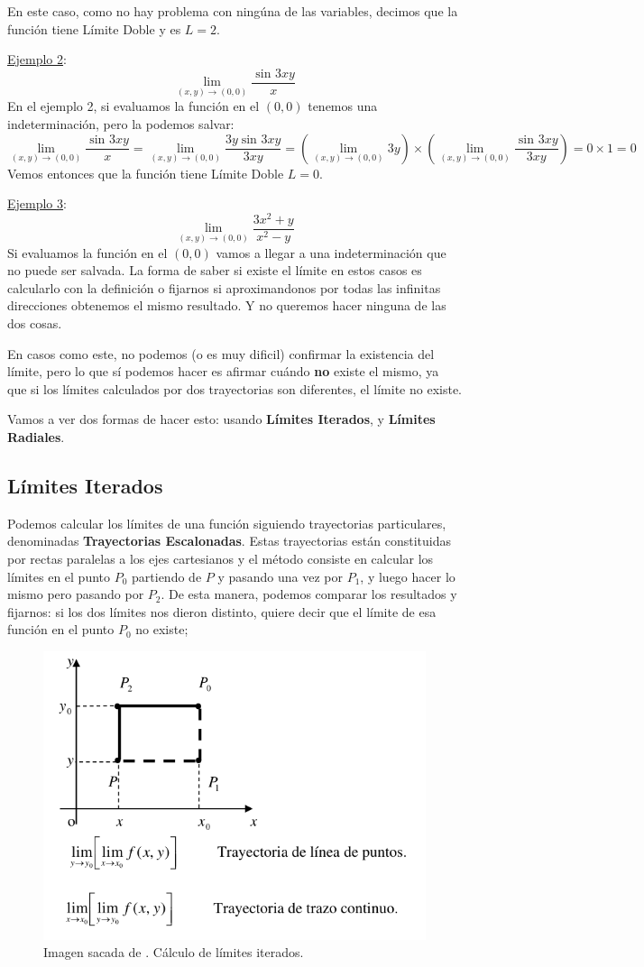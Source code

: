 \documentclass[12pt]{article}
\begin{document}
En este caso, como no hay problema con ningúna de las variables, decimos que la función tiene Límite Doble y es $ L = 2 $.

\underline{Ejemplo 2}:
\[
\lim_{(x,y) \to (0,0)}{\frac{\sin^{} 3xy}{x}}
\]
En el ejemplo 2, si evaluamos la función en el $ (0,0) $ tenemos una indeterminación, pero la podemos salvar:
\[
\lim_{(x,y) \to (0,0)}{\frac{\sin^{} 3xy}{x}} = \lim_{(x,y) \to (0,0)}{\frac{3y\sin^{}3xy}{3xy}} = \left(\lim_{(x,y) \to (0,0)}{3y}\right)\times\left(\lim_{(x,y) \to (0,0)}{\frac{\sin^{}3xy}{3xy}}\right) = 0\times1 = 0
\]
Vemos entonces que la función tiene Límite Doble $ L = 0 $.

\underline{Ejemplo 3}:
\[
\lim_{(x,y) \to (0,0)}{\frac{3x^{2}+y}{x^{2}-y}}
\]
Si evaluamos la función en el $ (0,0) $ vamos a llegar a una indeterminación que no puede ser salvada. La forma de saber si existe el límite en estos casos es calcularlo con la definición o fijarnos si aproximandonos por todas las infinitas direcciones obtenemos el mismo resultado. Y no queremos hacer ninguna de las dos cosas.

En casos como este, no podemos (o es muy dificil) confirmar la existencia del límite, pero lo que sí podemos hacer es afirmar cuándo \textbf{no} existe el mismo, ya que si los límites calculados por dos trayectorias son diferentes, el límite no existe.

Vamos a ver dos formas de hacer esto: usando \textbf{Límites Iterados}, y \textbf{Límites Radiales}.

\subsection{Límites Iterados}
Podemos calcular los límites de una función siguiendo trayectorias particulares, denominadas \textbf{Trayectorias Escalonadas}. Estas trayectorias están constituidas por rectas paralelas a los ejes cartesianos y el método consiste en calcular los límites en el punto $ P_{0} $ partiendo de $ P $ y pasando una vez por $ P_{1} $, y luego hacer lo mismo pero pasando por $ P_{2} $. De esta manera, podemos comparar los resultados y fijarnos: si los dos límites nos dieron distinto, quiere decir que el límite de esa función en el punto $ P_{0} $ no existe;

\begin{figure}[H]
  \centering
  \includegraphics[width=0.5\linewidth]{imagenes/limites_iterados.png}
  \caption{Imagen sacada de \parencite{am2monllor}. Cálculo de límites iterados.}
  \label{fig:limites_iterados}
\end{figure}
\end{document}
